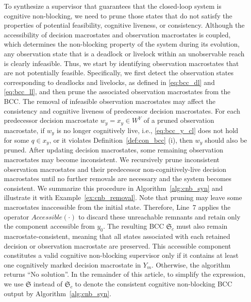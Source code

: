 \documentclass[final,5p,times,twocolumn,authoryear]{elsarticle}
\begin{document}
%
%
%
To synthesize a supervisor that guarantees that the closed-loop system is cognitive non-blocking, we need to prune those states that do not satisfy the properties of potential feasibility, cognitive liveness, or consistency.
%
Although the accessibility of decision macrostates and observation macrostates is coupled, which determines the non-blocking property of the system during its evolution,  any observation state that is a deadlock or livelock within an unobservable reach is clearly infeasible. 
Thus, we start by identifying observation macrostates that are not potentially feasible. 
Specifically, we first detect the observation states corresponding to deadlocks and livelocks, as defined in \eqref{eq:bcc_dl} and \eqref{eq:bcc_ll}, and then prune the associated observation macrostates from the BCC.
%
The removal of infeasible observation macrostates may affect the consistency and cognitive liveness of predecessor decision macrostates. 
For each predecessor decision macrostate $w_y = x_y \in W^Y$ of a pruned observation macrostate, 
if $w_y$ is no longer cognitively live, i.e., \eqref{eq:bcc_y_cl} does not hold for some $q \in x_y$, or it violates Definition~\ref{def:con_bcc} (i), then $w_y$ should also be pruned.
%
After updating decision macrostates, some remaining observation macrostates may become inconsistent. 
We recursively prune inconsistent observation macrostates and their predecessor non-cognitively-live decision macrostates until no further removals are necessary and the system becomes consistent. 
%
We summarize this procedure in Algorithm~\ref{alg:cnb_syn} and illustrate it with Example~\ref{ex:cnb_removal}.
%
Note that pruning may leave some macrostates inaccessible from the initial state.
%
Therefore, Line~7 applies the operator $Accessible(\cdot)$ to discard these unreachable remnants and retain only the component accessible from $y_0$.
The resulting BCC $\mathfrak{S}_c$ must also remain macrostate-consistent, meaning that all states associated with each retained decision or observation macrostate are preserved.
This accessible component constitutes a valid cognitive non-blocking supervisor only if it contains at least one cognitively marked decision macrostate in $Y_m$.
Otherwise, the algorithm returns ``No solution''.
%
In the remainder of this article, to simplify the expression, we use $\mathfrak{S}$ instead of $\mathfrak{S}_c$ to denote the consistent cognitive non-blocking BCC output by Algorithm~\ref{alg:cnb_syn}.
\end{document}
